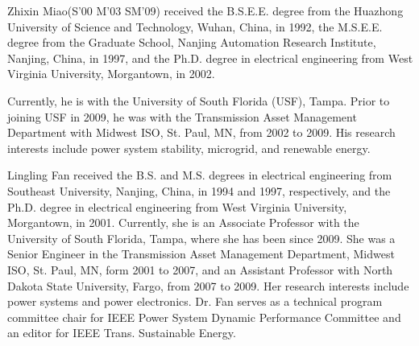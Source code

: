 \documentclass[10pt, journal, final, twocolumns]{IEEEtran}
\begin{document}


\vspace{-0.3in}
\begin{IEEEbiographynophoto}{Zhixin Miao}(S'00 M'03 SM'09) received the
B.S.E.E. degree from the Huazhong University of
Science and Technology, Wuhan, China, in 1992, the
M.S.E.E. degree from the Graduate School, Nanjing
Automation Research Institute, Nanjing, China, in
1997, and the Ph.D. degree in electrical engineering
from West Virginia University, Morgantown, in
2002.

Currently, he is with the University of South
Florida (USF), Tampa. Prior to joining USF in 2009,
he was with the Transmission Asset Management
Department with Midwest ISO, St. Paul, MN, from 2002 to 2009. His research
interests include power system stability, microgrid, and renewable energy.
\end{IEEEbiographynophoto}
\begin{IEEEbiographynophoto}{Lingling Fan}
received the B.S. and M.S. degrees in electrical engineering from Southeast University,
Nanjing, China, in 1994 and 1997, respectively, and the Ph.D. degree in electrical engineering
from West Virginia University, Morgantown, in 2001.
Currently, she is an Associate Professor with the University of South Florida, Tampa, where she has
been since 2009. She was a Senior Engineer in the Transmission Asset Management Department, Midwest
ISO, St. Paul, MN, form 2001 to 2007, and an Assistant Professor with North Dakota State University,
Fargo, from 2007 to 2009. Her research interests include power systems and power electronics. Dr. Fan serves as a technical program committee chair for IEEE Power System Dynamic Performance Committee and an editor for IEEE Trans. Sustainable Energy.
\end{IEEEbiographynophoto}
\end{document}

